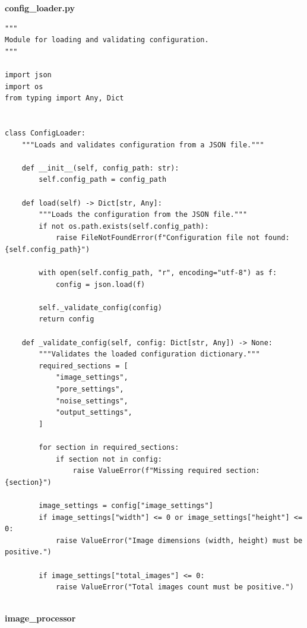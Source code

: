 \documentclass[code]{wordcore}
\begin{document}
\textbf{config\_loader.py}

\begin{code}
	\begin{verbatim}
"""
Module for loading and validating configuration.
"""

import json
import os
from typing import Any, Dict


class ConfigLoader:
    """Loads and validates configuration from a JSON file."""

    def __init__(self, config_path: str):
        self.config_path = config_path

    def load(self) -> Dict[str, Any]:
        """Loads the configuration from the JSON file."""
        if not os.path.exists(self.config_path):
            raise FileNotFoundError(f"Configuration file not found: {self.config_path}")

        with open(self.config_path, "r", encoding="utf-8") as f:
            config = json.load(f)

        self._validate_config(config)
        return config

    def _validate_config(self, config: Dict[str, Any]) -> None:
        """Validates the loaded configuration dictionary."""
        required_sections = [
            "image_settings",
            "pore_settings",
            "noise_settings",
            "output_settings",
        ]

        for section in required_sections:
            if section not in config:
                raise ValueError(f"Missing required section: {section}")

        image_settings = config["image_settings"]
        if image_settings["width"] <= 0 or image_settings["height"] <= 0:
            raise ValueError("Image dimensions (width, height) must be positive.")

        if image_settings["total_images"] <= 0:
            raise ValueError("Total images count must be positive.")
    
  \end{verbatim}
\end{code}

\textbf{image\_processor}
\end{document}
